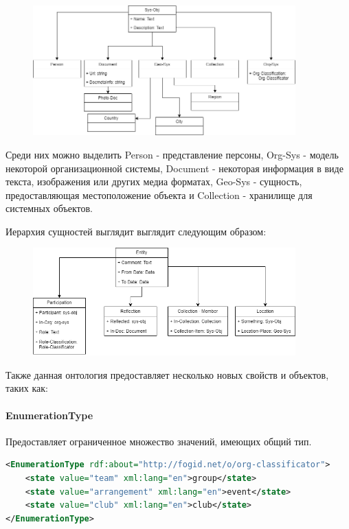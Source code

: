 \documentclass[12pt]{article}
\begin{document}
\begin{figure}[!ht]
    \centering
    \includegraphics[width=0.9\textwidth]{_images/sys_obj_all.png}
\end{figure}

Среди них можно выделить Person - представление персоны, Org-Sys - модель некоторой организационной системы, Document - некоторая информация в виде текста, изображения или других медиа форматах, Geo-Sys - сущность, предоставляющая местоположение объекта и Collection - хранилище для системных объектов.

\pagebreak

Иерархия сущностей выглядит выглядит следующим образом:

\begin{figure}[!ht]
    \centering
    \includegraphics[width=0.9\textwidth]{_images/ent_all.png}
\end{figure}

Также данная онтология предоставляет несколько новых свойств и объектов, таких как:

\paragraph{EnumerationType} Предоставляет ограниченное множество значений, имеющих общий тип.

\begin{lstlisting}[language=XML]
<EnumerationType rdf:about="http://fogid.net/o/org-classificator">
    <state value="team" xml:lang="en">group</state>
    <state value="arrangement" xml:lang="en">event</state>
    <state value="club" xml:lang="en">club</state>
</EnumerationType>
\end{lstlisting}
\end{document}
